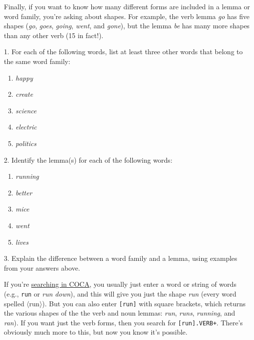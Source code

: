 Finally, if you want to know how many different forms are included in a lemma or word family, you're asking about shapes. For example, the verb lemma \textit{go} has five shapes (\textit{go}, \textit{goes}, \textit{going}, \textit{went}, and \textit{gone}), but the lemma \textit{be} has many more shapes than any other verb (15 in fact!).

\begin{tcolorbox}[title=Exercise: Word Families and Lemmas, colback=white, colframe=blue!75!black, fonttitle=\bfseries]
1. For each of the following words, list at least three other words that belong to the same word family:

\begin{enumerate}
    \item \textit{happy}
    \item \textit{create}
    \item \textit{science}
    \item \textit{electric}
    \item \textit{politics}
\end{enumerate}

2. Identify the lemma(s) for each of the following words:

\begin{enumerate}
    \item \textit{running}
    \item \textit{better}
    \item \textit{mice}
    \item \textit{went}
    \item \textit{lives}
\end{enumerate}

3. Explain the difference between a word family and a lemma, using examples from your answers above.
\end{tcolorbox}

\begin{tcolorbox}[title=Searching for shapes and lemmas]
    If you're \href{https://www.english-corpora.org/coca/}{searching in COCA}, you usually just enter a word or string of words (e.g., \texttt{run} or \textit{run down}), and this will give you just the shape \textit{run} (every word spelled $\langle$run$\rangle$). But you can also enter \texttt{[run]} with square brackets, which returns the various shapes of the the verb and noun lemmas: \textit{run}, \textit{runs}, \textit{running}, and \textit{ran}). If you want just the verb forms, then you search for \texttt{[run].VERB+}. There's obviously much more to this, but now you know it's possible.
\end{tcolorbox}

